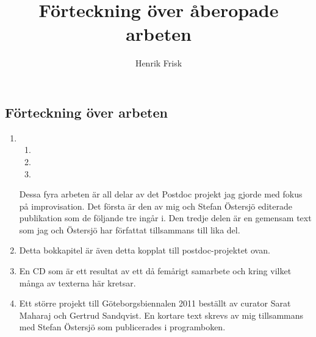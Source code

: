 \documentclass[a4paper]{article}
\title{Förteckning över åberopade arbeten}
\author{Henrik Frisk}
\begin{document}

\thispagestyle{empty}


\begin{center}
  \section*{\textsf{Förteckning över arbeten}}
\end{center}

\vspace{0.6cm}

\begin{enumerate}
\item {} %

  \begin{enumerate}
  \item {}
  \item {}
  \item {}
  \end{enumerate}

Dessa fyra arbeten är all delar av det Postdoc projekt jag gjorde med fokus på improvisation. Det första är den av mig och Stefan Östersjö editerade publikation som de följande tre ingår i. Den tredje delen är en gemensam text som jag och Östersjö har författat tillsammans till lika del.

\vspace{0.4cm}

\item {}

Detta bokkapitel är även detta kopplat till postdoc-projektet ovan.

\vspace{0.4cm}

\item {}

En CD som är ett resultat av ett då femårigt samarbete och kring vilket många av texterna här kretsar.

\vspace{0.4cm}

\item {}

Ett större projekt till Göteborgsbiennalen 2011 beställt av curator Sarat Maharaj och Gertrud Sandqvist. En kortare text skrevs av mig tillsammans med Stefan Östersjö som publicerades i programboken.


\end{enumerate}
\end{document}
